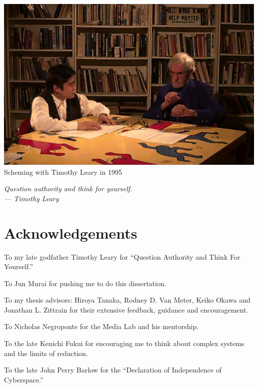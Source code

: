



\begin{center}
  \includegraphics[width=.5\textwidth]{pictures/timleary.jpg}
  \\
  Scheming with Timothy Leary in 1995
\end{center}


\begin{flushright}{\slshape    
Question authority and think for yourself.  \\ \medskip
--- Timothy Leary}
\end{flushright}

\bigskip


\begingroup

\let\clearpage\relax
\let\cleardoublepage\relax
\let\cleardoublepage\relax

\chapter*{Acknowledgements}

\noindent

To my late godfather Timothy Leary for ``Question Authority and Think For Yourself.''

To Jun Murai for pushing me to do this dissertation.

To my thesis advisors: Hiroya Tanaka, Rodney D. Van Meter, Keiko Okawa and Jonathan L. Zittrain for their extensive feedback, guidance and encouragement. 

To Nicholas Negroponte for the Media Lab and his mentorship.

To the late Kenichi Fukui for encouraging me to think about complex systems and the limits of reduction.

To the late John Perry Barlow for the ``Declaration of Independence of Cyberspace.''

